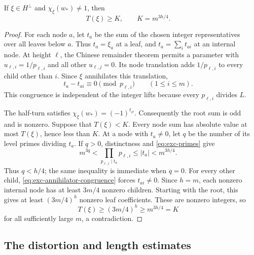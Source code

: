 \begin{lemma}
\label{lem:exc-annihilator}
If $\xi\in H^\perp$ and $\chi_\xi(w_*)\ne1$, then
\begin{equation}\label{eq:exc-annihilator-threshold}
 T(\xi)\ge K,\qquad K=m^{3h/4}.
\end{equation}
\end{lemma}

\begin{proof}
For each node $a$, let $t_a$ be the sum of the chosen integer
representatives over all leaves below $a$.  Thus $t_a=\xi_a$ at a leaf,
and $t_a=\sum_i t_{ai}$ at an internal node.  At height $\ell$, the Chinese
remainder theorem permits a parameter with
$u_{\ell,i}=1/p_{\ell,i}$ and all other $u_{\ell,j}=0$.  Its node
translation adds $1/p_{\ell,i}$ to every child other than $i$.  Since
$\xi$ annihilates this translation,
\begin{equation}\label{eq:exc-annihilator-congruence}
 t_a-t_{ai}\equiv0\pmod{p_{\ell,i}}
 \qquad(1\le i\le m).
\end{equation}
This congruence is independent of the integer lifts because every
$p_{\ell,i}$ divides $L$.

The half-turn satisfies $\chi_\xi(w_*)=(-1)^{t_{\varnothing}}$.
Consequently the root sum is odd and is nonzero.  Suppose that $T(\xi)<K$.
Every node sum has absolute value at most $T(\xi)$, hence less than $K$.
At a node with $t_a\ne0$, let $q$ be the number of its level primes
dividing $t_a$.  If $q>0$, distinctness and \eqref{eq:exc-primes} give
\[
 m^{3q}
 <\prod_{p_{\ell,i}\mid t_a}p_{\ell,i}
 \le |t_a|<m^{3h/4}.
\]
Thus $q<h/4$; the same inequality is immediate when $q=0$.
For every other child, \eqref{eq:exc-annihilator-congruence} forces
$t_{ai}\ne0$.  Since $h=m$, each nonzero internal node has at least
$3m/4$ nonzero children.  Starting with the root, this gives at least
$(3m/4)^h$ nonzero leaf coefficients.  These are nonzero integers, so
\[
 T(\xi)\ge(3m/4)^h\ge m^{3h/4}=K
\]
for all sufficiently large $m$, a contradiction.
\end{proof}

\subsection{The distortion and length estimates}

